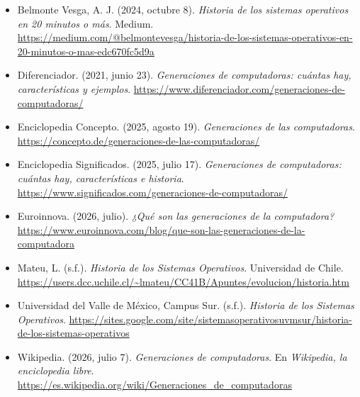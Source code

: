 \documentclass[12pt,letterpaper]{article}
\begin{document}
\begin{itemize}[leftmargin=1.5em,itemsep=8pt]

\item[] Belmonte Vesga, A. J. (2024, octubre 8). \textit{Historia de los sistemas operativos en 20 minutos o más}. Medium. \url{https://medium.com/@belmontevesga/historia-de-los-sistemas-operativos-en-20-minutos-o-mas-edc670fc5d9a}

\item[] Diferenciador. (2021, junio 23). \textit{Generaciones de computadoras: cuántas hay, características y ejemplos}. \url{https://www.diferenciador.com/generaciones-de-computadoras/}

\item[] Enciclopedia Concepto. (2025, agosto 19). \textit{Generaciones de las computadoras}. \url{https://concepto.de/generaciones-de-las-computadoras/}

\item[] Enciclopedia Significados. (2025, julio 17). \textit{Generaciones de computadoras: cuántas hay, características e historia}. \url{https://www.significados.com/generaciones-de-computadoras/}

\item[] Euroinnova. (2026, julio). \textit{¿Qué son las generaciones de la computadora?} \url{https://www.euroinnova.com/blog/que-son-las-generaciones-de-la-computadora}

\item[] Mateu, L. (s.f.). \textit{Historia de los Sistemas Operativos}. Universidad de Chile. \url{https://users.dcc.uchile.cl/~lmateu/CC41B/Apuntes/evolucion/historia.htm}

\item[] Universidad del Valle de México, Campus Sur. (s.f.). \textit{Historia de los Sistemas Operativos}. \url{https://sites.google.com/site/sistemasoperativosuvmsur/historia-de-los-sistemas-operativos}

\item[] Wikipedia. (2026, julio 7). \textit{Generaciones de computadoras}. En \textit{Wikipedia, la enciclopedia libre}. \url{https://es.wikipedia.org/wiki/Generaciones_de_computadoras}

\end{itemize}
\end{document}
